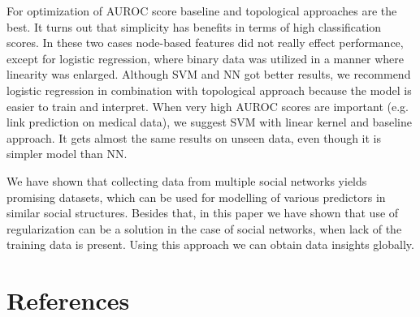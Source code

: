 \documentclass[9pt,twocolumn,twoside]{pnas-new}
\begin{document}
For optimization of AUROC score baseline and topological approaches are the best. It turns out that simplicity has benefits in terms of high classification scores. In these two cases node-based features did not really effect performance, except for logistic regression, where binary data was utilized in a manner where linearity was enlarged. Although SVM and NN got better results, we recommend logistic regression in combination with topological approach because the model is easier to train and interpret. When very high AUROC scores are important (e.g. link prediction on medical data), we suggest SVM with linear kernel and baseline approach. It gets almost the same results on unseen data, even though it is simpler model than NN.

We have shown that collecting data from multiple social networks yields promising datasets, which can be used for modelling of various predictors in similar social structures. Besides that, in this paper we have shown that use of regularization can be a solution in the case of social networks, when lack of the training data is present. Using this approach we can obtain data insights globally. 







\section*{References}


\end{document}
